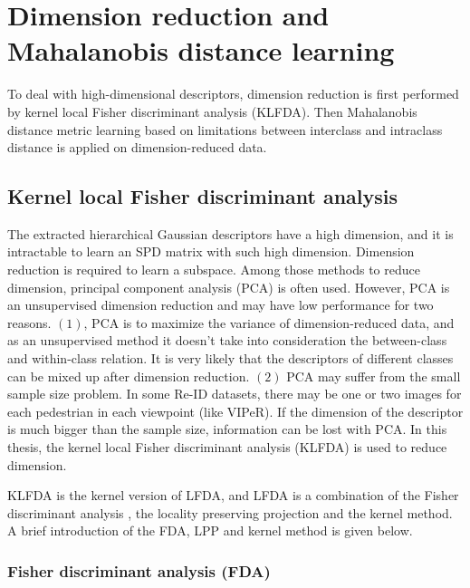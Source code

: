 \chapter{Dimension reduction and Mahalanobis distance learning}
To deal with high-dimensional descriptors, dimension reduction is first performed by kernel local Fisher discriminant analysis (KLFDA). Then Mahalanobis distance metric learning based on limitations between interclass and intraclass distance is applied on dimension-reduced data.
\section{Kernel local Fisher discriminant analysis}
The extracted hierarchical Gaussian descriptors have a high dimension, and it is intractable to learn an SPD matrix with such high dimension. Dimension reduction is required to learn a subspace.
Among those methods to reduce dimension, principal component analysis (PCA) is often used. However, PCA is an unsupervised dimension reduction and may have low performance for two reasons. $(1)$, PCA is to maximize the variance of dimension-reduced data, and as an unsupervised method it doesn't take into consideration the between-class and within-class relation. It is very likely that the descriptors of different classes can be mixed up after dimension reduction. $(2)$ PCA may suffer from the small sample size problem. In some Re-ID datasets, there may be one or two images for each pedestrian in each viewpoint (like VIPeR). If the dimension of the descriptor is much bigger than the sample size, information can be lost with PCA. In this thesis, the kernel local Fisher discriminant analysis (KLFDA) is used to reduce dimension. 

KLFDA is the kernel version of LFDA, and LFDA is a combination of the Fisher discriminant analysis \cite{LFDA}, the locality preserving projection \cite{LPP} and the kernel method. A brief introduction of the FDA, LPP and kernel method is given below.
\subsection{Fisher discriminant analysis (FDA)}

